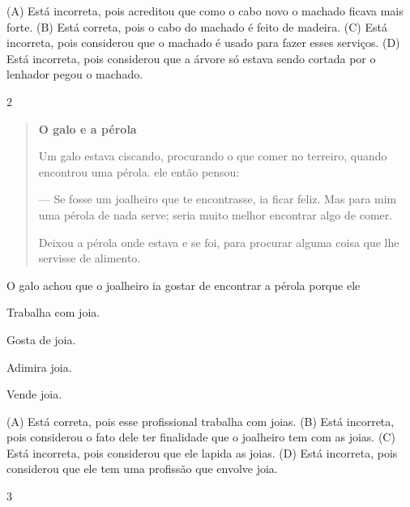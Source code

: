 
(A) Está incorreta, pois acreditou que como o cabo novo o machado ficava
mais forte.
(B) Está correta, pois o cabo do machado é feito de madeira.
(C) Está incorreta, pois considerou que o machado é usado para fazer
esses serviços.
(D) Está incorreta, pois considerou que a árvore só estava sendo cortada
por o lenhador pegou o machado.

\num{2}

\begin{quote}
\textbf{O galo e a pérola}

Um galo estava ciscando, procurando o que comer no terreiro,
quando encontrou uma pérola. ele então pensou:

--- Se fosse um joalheiro que te encontrasse, ia ficar feliz.
Mas para mim uma pérola de nada serve; seria muito melhor
encontrar algo de comer.

Deixou a pérola onde estava e se foi, para procurar
alguma coisa que lhe servisse de alimento.
\end{quote}


O galo achou que o joalheiro ia gostar de encontrar a pérola porque ele

\begin{escolha}
\item Trabalha com joia.

\item Gosta de joia.

\item Adimira joia.

\item Vende joia.
\end{escolha}


(A) Está correta, pois esse profissional trabalha com joias.
(B) Está incorreta, pois considerou o fato dele ter finalidade que o
joalheiro tem com as joias.
(C) Está incorreta, pois considerou que ele lapida as joias.
(D) Está incorreta, pois considerou que ele tem uma profissão que
envolve joia.

\num{3}

